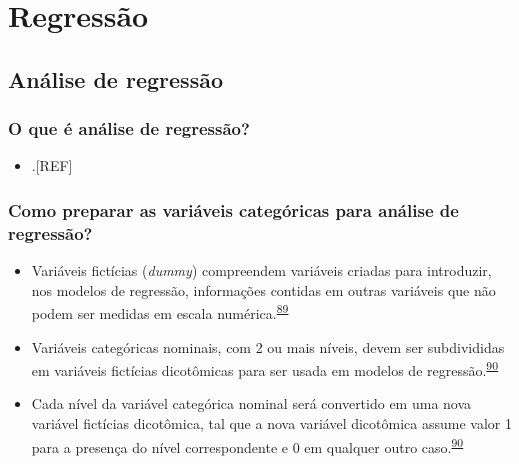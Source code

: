 \documentclass[
]{book}
\providecommand{\tightlist}{%
  \setlength{\itemsep}{0pt}\setlength{\parskip}{0pt}}
\begin{document}
\hypertarget{analise-inferencial-regressao}{%
\chapter{\texorpdfstring{\textbf{Regressão}}{Regressão}}\label{analise-inferencial-regressao}}

\hypertarget{analise-regressao}{%
\section{Análise de regressão}\label{analise-regressao}}

\hypertarget{o-que-uxe9-anuxe1lise-de-regressuxe3o}{%
\subsection{O que é análise de regressão?}\label{o-que-uxe9-anuxe1lise-de-regressuxe3o}}

\begin{itemize}
\tightlist
\item
  .{[}REF{]}
\end{itemize}

\hypertarget{como-preparar-as-variuxe1veis-categuxf3ricas-para-anuxe1lise-de-regressuxe3o}{%
\subsection{Como preparar as variáveis categóricas para análise de regressão?}\label{como-preparar-as-variuxe1veis-categuxf3ricas-para-anuxe1lise-de-regressuxe3o}}

\begin{itemize}
\item
  Variáveis fictícias (\emph{dummy}) compreendem variáveis criadas para introduzir, nos modelos de regressão, informações contidas em outras variáveis que não podem ser medidas em escala numérica.\textsuperscript{\protect\hyperlink{ref-suits1957}{89}}
\item
  Variáveis categóricas nominais, com 2 ou mais níveis, devem ser subdivididas em variáveis fictícias dicotômicas para ser usada em modelos de regressão.\textsuperscript{\protect\hyperlink{ref-Healy1995}{90}}
\item
  Cada nível da variável categórica nominal será convertido em uma nova variável fictícias dicotômica, tal que a nova variável dicotômica assume valor 1 para a presença do nível correspondente e 0 em qualquer outro caso.\textsuperscript{\protect\hyperlink{ref-Healy1995}{90}}
\end{itemize}
\end{document}

